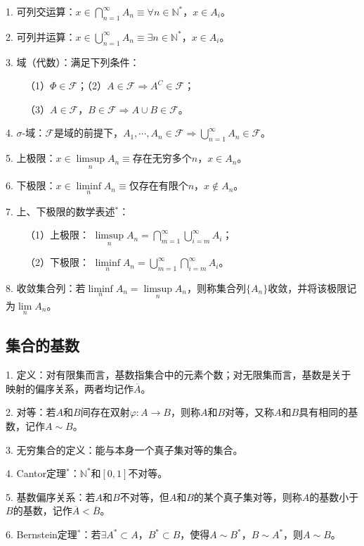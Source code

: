 1. 可列交运算：$x \in \bigcap\limits_{n=1}^\infty A_n \equiv \forall n \in \mathbb{N}^*$，$x \in A_i$。

2. 可列并运算：$x \in \bigcup\limits_{n=1}^\infty A_n \equiv \exists n \in \mathbb{N}^* $，$x \in A_i$。

3. 域（代数）：满足下列条件：

~~~~（1）$\Phi \in \mathscr{F}$；（2）$A \in \mathscr{F}\Rightarrow A^C \in \mathscr{F}$；

~~~~（3）$A \in \mathscr{F}$，$B \in \mathscr{F}\Rightarrow A \cup B \in  \mathscr{F}$。

4. $\sigma$-域：$\mathscr{F}$是域的前提下，$A_1,\cdots,A_n\in \mathscr{F}\Rightarrow \bigcup\limits_{n=1}^\infty A_n\in \mathscr{F}$。

5. 上极限：$x \in \limsup\limits_n A_n \equiv$存在无穷多个$n$，$x \in A_n$。

6. 下极限：$x \in \liminf\limits_n A_n \equiv$仅存在有限个$n$，$x \notin A_n$。

7. 上、下极限的数学表述$^*$：

~~~~（1）上极限： $\limsup\limits_n A_n =\bigcap\limits_{m=1}^\infty \bigcup\limits_{i=m}^\infty A_i$；

~~~~（2）下极限： $\liminf\limits_n A_n =\bigcup\limits_{m=1}^\infty \bigcap\limits_{i=m}^\infty A_i$。

8. 收敛集合列：若$\liminf\limits_n A_n=\limsup\limits_n A_n$，则称集合列$\{A_n\}$收敛，并将该极限记为$\lim\limits_n A_n$。


\subsection{集合的基数}

1. 定义：对有限集而言，基数指集合中的元素个数；对无限集而言，基数是关于映射的偏序关系，两者均记作$\overline{A}$。

2. 对等：若$A$和$B$间存在双射$\varphi:A\rightarrow B$，则称$A$和$B$对等，又称$A$和$B$具有相同的基数，记作$A\sim B$。

3. 无穷集合的定义：能与本身一个真子集对等的集合。

4. Cantor定理$^*$：$\mathbb{N}^*$和$[0,1]$不对等。

5. 基数偏序关系：若$A$和$B$不对等，但$A$和$B$的某个真子集对等，则称$A$的基数小于$B$的基数，记作$\overline{A}<\overline{B}$。

6. Bernstein定理$^*$：若$\exists A^* \subset A$，$B^* \subset B$，使得$A\sim B^*$，$B \sim A^*$，则$A\sim B$。

